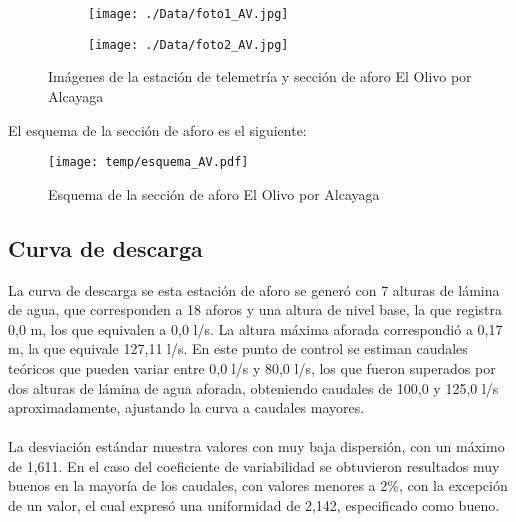 \documentclass[]{article}
\begin{document}
\begin{figure}[H]
  \centering
\begin{subfigure}{.49\textwidth}
  \texttt{[image: ./Data/foto1\_AV.jpg]}
\end{subfigure}
\hfill
\begin{subfigure}{.49\textwidth}
  \texttt{[image: ./Data/foto2\_AV.jpg]}
\end{subfigure}
\caption{Imágenes de la estación de telemetría y sección de aforo El Olivo por Alcayaga}
\label{fig:fotos_22}
\end{figure}

El esquema de la sección de aforo es el siguiente:

\begin{figure}[H]
  \centering
  \texttt{[image: temp/esquema\_AV.pdf]}
\caption{Esquema de la sección de aforo El Olivo por Alcayaga}
\label{fig:Esquema_AV}
\end{figure}

\subsection{Curva de descarga}\label{curva-de-descarga-21}

La curva de descarga se esta estación de aforo se generó con 7 alturas de lámina de agua, que corresponden a 18 aforos y una altura de nivel base, la que registra 0,0 m, los que equivalen a 0,0 l/s. La altura máxima aforada correspondió a 0,17 m, la que equivale 127,11 l/s. En este punto de control se estiman caudales teóricos que pueden variar entre 0,0 l/s y 80,0 l/s, los que fueron superados por dos alturas de lámina de agua aforada, obteniendo caudales de 100,0 y 125,0 l/s aproximadamente, ajustando la curva a caudales mayores.\\
\\
La desviación estándar muestra valores con muy baja dispersión, con un máximo de 1,611. En el caso del coeficiente de variabilidad se obtuvieron resultados muy buenos en la mayoría de los caudales, con valores menores a 2\%, con la excepción de un valor, el cual expresó una uniformidad de 2,142, especificado como bueno.
\end{document}
